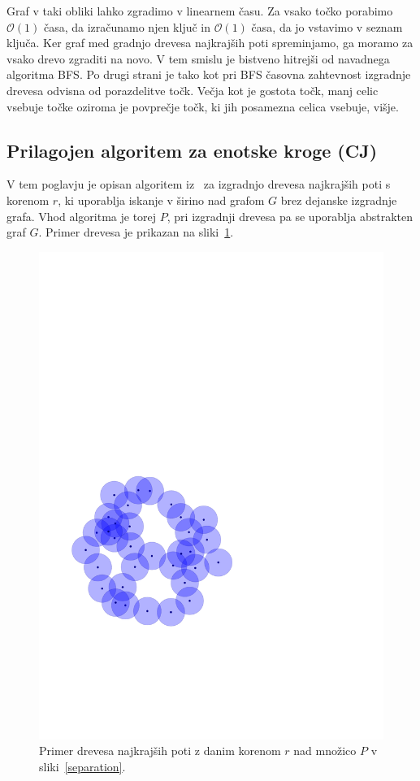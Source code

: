 \documentclass[a4paper, 12pt]{book}
\newcommand{\OO}{\ensuremath{\mathcal{O}}} %
\begin{document}
Graf v taki obliki lahko zgradimo v linearnem času. Za vsako točko porabimo $\OO(1)$ časa, da izračunamo njen ključ in $\OO(1)$ časa, da jo vstavimo v seznam ključa. Ker graf med gradnjo drevesa najkrajših poti spreminjamo, ga moramo za vsako drevo zgraditi na novo. V tem smislu je bistveno hitrejši od navadnega algoritma BFS. Po drugi strani je tako kot pri BFS časovna zahtevnost izgradnje drevesa odvisna od porazdelitve točk. Večja kot je gostota točk, manj celic vsebuje točke oziroma je povprečje točk, ki jih posamezna celica vsebuje, višje.

\subsection{Prilagojen algoritem za enotske kroge (CJ)}
\label{sssp-tree}
V tem poglavju je opisan algoritem iz~\cite{CJ15} za izgradnjo drevesa najkrajših poti s korenom $r$, ki uporablja iskanje v širino nad grafom $G$ brez dejanske izgradnje grafa. Vhod algoritma je torej $P$, pri izgradnji drevesa pa se uporablja abstrakten graf $G$. Primer drevesa je prikazan na sliki~\ref{sssp-tree-ex}.

\begin{figure}[htp]
\centerline{\includegraphics[scale=0.6,page=6]{pics/unitdisks.pdf}}
\caption{Primer drevesa najkrajših poti z danim korenom $r$ nad množico $P$ v sliki~\ref{separation}.}
\label{sssp-tree-ex}
\end{figure}
\end{document}
